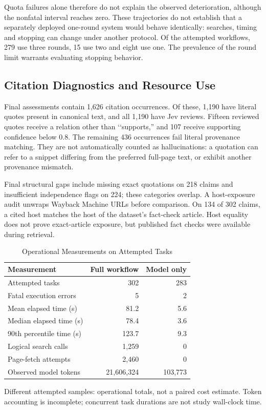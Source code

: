 \documentclass[conference]{IEEEtran}
\begin{document}
Quota failures alone therefore do not explain the observed deterioration, although the nonfatal interval reaches zero. These trajectories do not establish that a separately deployed one-round system would behave identically: searches, timing and stopping can change under another protocol. Of the attempted workflows, 279 use three rounds, 15 use two and eight use one. The prevalence of the round limit warrants evaluating stopping behavior.

\subsection{Citation Diagnostics and Resource Use}
Final assessments contain 1,626 citation occurrences. Of these, 1,190 have literal quotes present in canonical text, and all 1,190 have Jev reviews. Fifteen reviewed quotes receive a relation other than \lq\lq supports,'' and 107 receive supporting confidence below 0.8. The remaining 436 occurrences fail literal provenance matching. They are not automatically counted as hallucinations: a quotation can refer to a snippet differing from the preferred full-page text, or exhibit another provenance mismatch.

Final structural gaps include missing exact quotations on 218 claims and insufficient independence flags on 224; these categories overlap. A host-exposure audit unwraps Wayback Machine URLs before comparison. On 134 of 302 claims, a cited host matches the host of the dataset's fact-check article. Host equality does not prove exact-article exposure, but published fact checks were available during retrieval.

\begin{table}[t]
\caption{Operational Measurements on Attempted Tasks}
\label{tab:cost}
\centering
\footnotesize
\begin{tabular}{@{}lrr@{}}
\toprule
Measurement & Full workflow & Model only\\
\midrule
Attempted tasks & 302 & 283\\
Fatal execution errors & 5 & 2\\
Mean elapsed time (s) & 81.2 & 5.6\\
Median elapsed time (s) & 78.4 & 3.6\\
90th percentile time (s) & 123.7 & 9.3\\
Logical search calls & 1,259 & 0\\
Page-fetch attempts & 2,460 & 0\\
Observed model tokens & 21,606,324 & 103,773\\
\bottomrule
\end{tabular}
\par\smallskip
\parbox{\columnwidth}{\scriptsize Different attempted samples: operational totals, not a paired cost estimate. Token accounting is incomplete; concurrent task durations are not study wall-clock time.}
\end{table}
\end{document}
